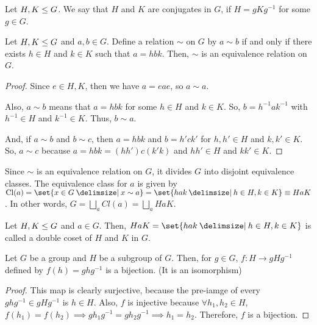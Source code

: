 \documentclass[11pt]{penrose}
\begin{document}
\begin{ndfn}
    Let $H, K \mathrel{\leq} G$. We say that $H$ and $K$ are conjugates in $G$, if $H = g K g^{-1}$ for some $g \in G$.
\end{ndfn}

\begin{nprop}
    Let $H, K \mathrel{\leq} G$ and $a, b \in G$. Define a relation $\sim$ on $G$ by $a \sim b$ if and only if there exists $h \in H$ and $k \in K$ such that $a = hbk$. Then, $\sim$ is an equivalence relation on $G$.
\end{nprop}
\begin{proof}
    Since $e \in H, K$, then we have $a = e a e$, so $a \sim a$.

    Also, $a \sim b$ means that $a = hbk$ for some $h \in H$ and $k \in K$. So, $b = h^{-1} a k^{-1}$ with $h^{-1} \in H$ and $k^{-1} \in K$. Thus, $b \sim a$.

    And, if $a \sim b$ and $b \sim c$, then $a = hbk$ and $b = h'ck'$ for $h, h' \in H$ and $k, k' \in K$. So, $a \sim c$ because $a = h b k = (h h') c (k' k)$ and $hh' \in H$ and $kk' \in K$.
\end{proof}

\begin{remark}
    Since $\sim$ is an equivalence relation on $G$, it divides $G$ into disjoint equivalence classes. The equivalence class for $a$ is given by $\mathrm{Cl}(a) = \set{x \in G \st x \sim a} = \set{hak \st h \in H, k \in K} \equiv HaK$. In other words, $\displaystyle G = \bigsqcup_{a} Cl(a) = \bigsqcup_{a} HaK$.

\end{remark}

\begin{ndfn}
    Let $H, K \mathrel{\leq} G$ and $a \in G$. Then, $HaK = \set{hak \st h \in H, k \in K}$ is called a double coset of $H$ and $K$ in $G$.
\end{ndfn}

\begin{nlemma}
    Let $G$ be a group and $H$ be a subgroup of $G$. Then, for $g \in G$, $f : H \to g H g^{-1}$ defined by $f(h) = ghg^{-1}$ is a bijection. (It is an isomorphism)
\end{nlemma}
\begin{proof}
    This map is clearly surjective, because the pre-iamge of every $ghg^{-1} \in gHg^{-1}$ is $h \in H$. Also, $f$ is injective because $\forall h_{1}, h_{2} \in H$, $f(h_{1}) = f(h_{2}) \implies gh_{1}g^{-1} = gh_{2}g^{-1} \implies h_{1} = h_{2}$. Therefore, $f$ is a bijection.
\end{proof}
\end{document}
